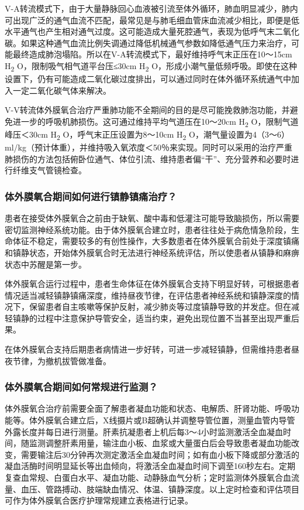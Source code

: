 V-A转流模式下，由于大量静脉回心血液被引流至体外循环，肺血明显减少，肺内可出现广泛的通气血流不匹配，最常见是与肺毛细血管床血流减少相比，即便是低水平通气也产生相对通气过度。这可能造成大量死腔通气，表现为低呼气末二氧化碳。如果这种通气血流比例失调通过降低机械通气参数如降低通气压力来治疗，可能最终造成肺泡塌陷。所以在V-A转流模式下，最好维持呼气末正压在10～15cm
H\textsubscript{2} O，限制吸气相气道平台压≤30cm H\textsubscript{2}
O，形成小潮气量低频呼吸。即使在这种设置下，仍有可能造成二氧化碳过度排出，可以通过同时在体外循环系统通气中加入一定二氧化碳气体来解决。

V-V转流体外膜氧合治疗严重肺功能不全期间的目的是尽可能挽救肺泡功能，并避免进一步的呼吸机肺损伤。这可通过维持平均气道压在10～20cm
H\textsubscript{2} O，限制气道峰压＜30cm H\textsubscript{2}
O，呼气末正压设置为8～10cm H\textsubscript{2}
O，潮气量设置为4（3～6）ml/kg（预计体重），并维持吸入氧浓度＜50％来实现。同时可以采用的治疗严重肺损伤的方法包括俯卧位通气、体位引流、维持患者偏“干”、充分营养和必要时进行纤维支气管镜检查。

\subsubsection{体外膜氧合期间如何进行镇静镇痛治疗？}

患者在接受体外膜氧合之前由于缺氧、酸中毒和低灌注可能导致脑损伤，所以需要密切监测神经系统功能。由于体外膜氧合建立时，患者往往处于病危情急阶段，生命体征不稳定，需要较多的有创性操作，大多数患者在体外膜氧合前处于深度镇痛和镇静状态，开始体外膜氧合时无法进行神经系统评估，所以使患者从镇静和麻痹状态中苏醒是第一步。

体外膜氧合运行过程中，患者生命体征在体外膜氧合支持下明显好转，可根据患者情况适当减轻镇静镇痛深度，维持昼夜节律，在评估患者神经系统和镇静深度的情况下，保留患者自主咳嗽等保护反射，减少肺炎等过度镇静导致的并发症。但在减轻镇静的过程中注意保护导管安全，适当约束，避免出现位置不当甚至出现严重后果。

在体外膜氧合支持后期患者病情进一步好转，可进一步减轻镇静，但需维持患者昼夜节律，为撤机拔管做准备。

\subsubsection{体外膜氧合期间如何常规进行监测？}

体外膜氧合治疗前需要全面了解患者凝血功能和状态、电解质、肝肾功能、呼吸功能等。体外膜氧合建立后，X线摄片或B超确认并调整导管位置，测量血管内导管外露长度并每日进行测量。肝素抗凝患者上机后每3～4小时监测激活全血凝血时间，随监测调整肝素用量，输注血小板、血浆或大量蛋白后会导致患者凝血功能改变，需要输注后30分钟再次测定激活全血凝血时间；如有血小板下降或部分激活的凝血活酶时间明显延长等出血倾向，将激活全血凝血时间下调至160秒左右。定期复查血常规、白蛋白水平、凝血功能、动静脉血气分析；定时监测体外膜氧合血流量、血压、管路搏动、肢端缺血情况、体温、镇静深度。以上定时检查和评估项目可作为体外膜氧合医疗护理常规建立表格进行记录。

